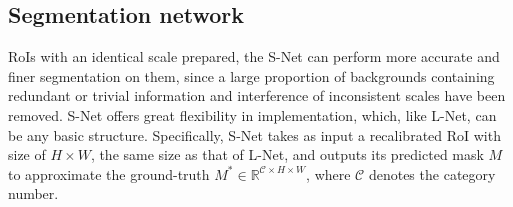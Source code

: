 \documentclass{article}
\begin{document}
    

\vspace{-10pt}
\subsection{Segmentation network}
\vspace{-5pt}
RoIs with an identical scale prepared, the S-Net can perform more accurate and finer segmentation on them, since a large proportion of backgrounds containing redundant or trivial information and interference of inconsistent scales have been removed. S-Net offers great flexibility in implementation, which, like L-Net, can be any basic structure. %
Specifically, S-Net takes as input a recalibrated RoI with size of $H \times W$, the same size as that of L-Net, and outputs its predicted mask $M$ to approximate the ground-truth $M^* \in \mathbb{R}^{\mathcal{C} \times H \times W}$, where $\mathcal{C}$ denotes the category number. 
\vspace{-10pt}
\end{document}
